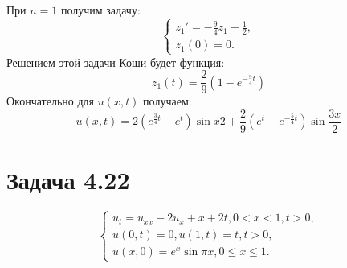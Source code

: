 \documentclass[11pt]{article}
\begin{document}
При $n = 1$ получим задачу:
\begin{equation*}
\begin{cases}
z_1' = -\frac94z_1 + \frac12, \\
z_1(0) = 0.
\end{cases}
\end{equation*}
Решением этой задачи Коши будет функция:
\begin{equation}
z_1(t) = \frac29(1 - e^{-\frac94t})
\end{equation}
Окончательно для $u(x, t)$ получаем:
\begin{equation}
u(x, t) = 2(e^{\frac34t} - e^t)\sin{x}2 + \frac29(e^t - e^{-\frac54t})\sin\frac{3x}2
\end{equation}
\section{Задача 4.22}
\label{sec:org4446fde}
\begin{equation}
\begin{cases}
u_t = u_{xx} - 2u_{x} + x + 2t, 0 < x < 1, t > 0, \\
u(0, t) = 0, u(1, t) = t, t > 0, \\
u(x, 0) = e^x\sin\pi x, 0 \leq x \leq 1.
\end{cases}
\end{equation}
\end{document}
